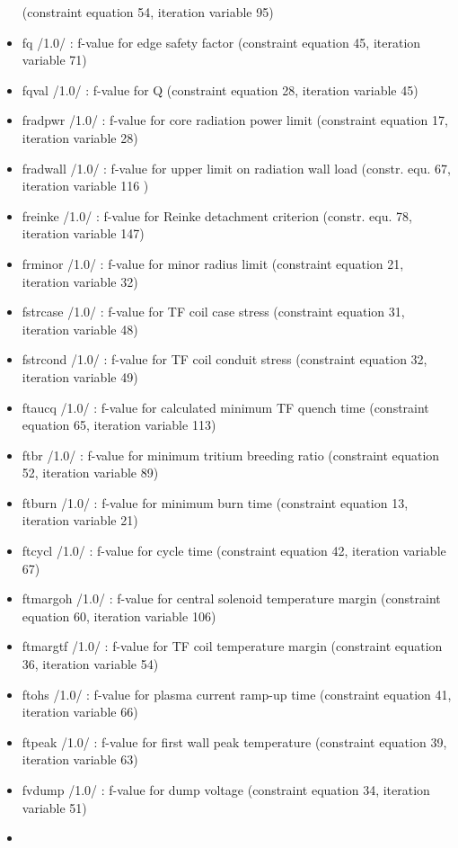 \documentclass[]{article}
\begin{document}
\begin{itemize}
  (constraint equation 54, iteration variable 95)
\item
  fq /1.0/ : f-value for edge safety factor (constraint equation 45,
  iteration variable 71)
\item
  fqval /1.0/ : f-value for Q (constraint equation 28, iteration
  variable 45)
\item
  fradpwr /1.0/ : f-value for core radiation power limit (constraint
  equation 17, iteration variable 28)
\item
  fradwall /1.0/ : f-value for upper limit on radiation wall load
  (constr. equ. 67, iteration variable 116 )
\item
  freinke /1.0/ : f-value for Reinke detachment criterion (constr. equ.
  78, iteration variable 147)
\item
  frminor /1.0/ : f-value for minor radius limit (constraint equation
  21, iteration variable 32)
\item
  fstrcase /1.0/ : f-value for TF coil case stress (constraint equation
  31, iteration variable 48)
\item
  fstrcond /1.0/ : f-value for TF coil conduit stress (constraint
  equation 32, iteration variable 49)
\item
  ftaucq /1.0/ : f-value for calculated minimum TF quench time
  (constraint equation 65, iteration variable 113)
\item
  ftbr /1.0/ : f-value for minimum tritium breeding ratio (constraint
  equation 52, iteration variable 89)
\item
  ftburn /1.0/ : f-value for minimum burn time (constraint equation 13,
  iteration variable 21)
\item
  ftcycl /1.0/ : f-value for cycle time (constraint equation 42,
  iteration variable 67)
\item
  ftmargoh /1.0/ : f-value for central solenoid temperature margin
  (constraint equation 60, iteration variable 106)
\item
  ftmargtf /1.0/ : f-value for TF coil temperature margin (constraint
  equation 36, iteration variable 54)
\item
  ftohs /1.0/ : f-value for plasma current ramp-up time (constraint
  equation 41, iteration variable 66)
\item
  ftpeak /1.0/ : f-value for first wall peak temperature (constraint
  equation 39, iteration variable 63)
\item
  fvdump /1.0/ : f-value for dump voltage (constraint equation 34,
  iteration variable 51)
\item

\end{itemize}
\end{document}
